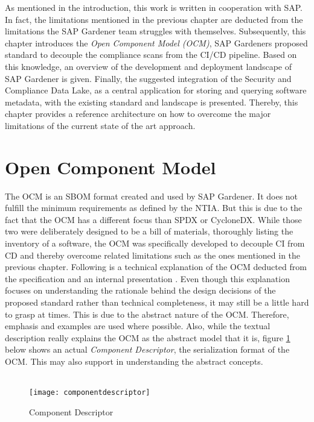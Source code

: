 As mentioned in the introduction, this work is written in cooperation with SAP. In fact, the limitations mentioned in the previous chapter are deducted from the limitations the SAP Gardener team struggles with themselves. Subsequently, this chapter introduces the \textit{Open Component Model (OCM)}, SAP Gardeners proposed standard to decouple the compliance scans from the CI/CD pipeline. Based on this knowledge, an overview of the development and deployment landscape of SAP Gardener is given. Finally, the suggested integration of the Security and Compliance Data Lake, as a central application for storing and querying software metadata, with the existing standard and landscape is presented. Thereby, this chapter provides a reference architecture on how to overcome the major limitations of the current state of the art approach. 

\section{Open Component Model} \label{sec:Open Component Model}
The OCM is an SBOM format created and used by SAP Gardener. It does not fulfill the minimum requirements as defined by the NTIA. But this is due to the fact that the OCM has a different focus than SPDX or CycloneDX. While those two were deliberately designed to be a bill of materials, thoroughly listing the inventory of a software, the OCM was specifically developed to decouple CI from CD and thereby overcome related limitations such as the ones mentioned in the previous chapter. Following is a technical explanation of the OCM deducted from the specification \cite{OCMSpec} and an internal presentation \cite{OCMInternalPresentation}. Even though this explanation focuses on understanding the rationale behind the design decisions of the proposed standard rather than technical completeness, it may still be a little hard to grasp at times. This is due to the abstract nature of the OCM. Therefore, emphasis and examples are used where possible. Also, while the textual description really explains the OCM as the abstract model that it is, figure \ref{fig:ComponentDescriptor} below shows an actual \emph{Component Descriptor}, the serialization format of the OCM. This may also support in understanding the abstract concepts.\\\\

\begin{figure}[H]
	\centering
	\texttt{[image: componentdescriptor]}
	\caption[Component Descriptor]{Component Descriptor }
	\label{fig:ComponentDescriptor}
\end{figure}


